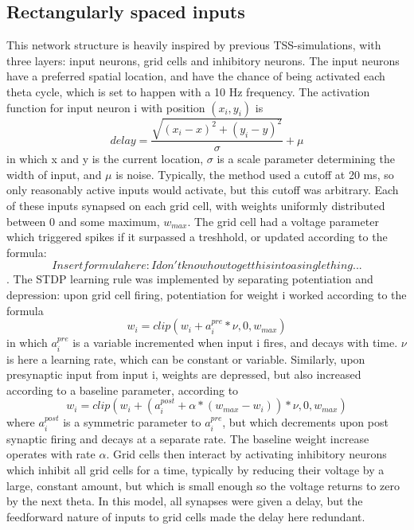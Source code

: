 \documentclass{article}
\begin{document}
    \subsection{Rectangularly spaced inputs} This network structure is heavily inspired by previous TSS-simulations, with three layers: input neurons, grid cells and inhibitory neurons. The input neurons have a preferred spatial location, and have the chance of being activated each theta cycle, which is set to happen with a 10 Hz frequency. The activation function for input neuron i with position \((x_i, y_i)\) is \[delay = \frac{\sqrt{(x_i - x)^2 + (y_i - y)^2}}{\sigma} + \mu\]
    in which x and y is the current location, \(\sigma\) is a scale parameter determining the width of input, and \(\mu\) is noise. Typically, the method used a cutoff at 20 ms, so only reasonably active inputs would activate, but this cutoff was arbitrary. Each of these inputs synapsed on each grid cell, with weights uniformly distributed between 0 and some maximum, \(w_{max}\). The grid cell had a voltage parameter which triggered spikes if it surpassed a treshhold, or updated according to the formula: \[ Insert formula here: I don't know how to get this into a single thing...\].
    The STDP learning rule was implemented by separating potentiation and depression: upon grid cell firing, potentiation for weight i worked according to the formula \[ w_i = clip(w_i + a^{pre}_i*\nu, 0, w_{max})\] in which \(a^{pre}_i\) is a variable incremented when input i fires, and decays with time. \(\nu\) is here a learning rate, which can be constant or variable. 
    Similarly, upon presynaptic input from input i, weights are depressed, but also increased according to a baseline parameter, according to \[ w_i = clip(w_i + (a^{post}_i + \alpha * (w_{max}-w_i))*\nu, 0, w_{max})\] where \(a^{post}_i\) is a symmetric parameter to \(a^{pre}_i\), but which decrements upon post synaptic firing and decays at a separate rate. The baseline weight increase operates with rate \(\alpha\).
    Grid cells then interact by activating inhibitory neurons which inhibit all grid cells for a time, typically by reducing their voltage by a large, constant amount, but which is small enough so the voltage returns to zero by the next theta.
    In this model, all synapses were given a delay, but the feedforward nature of inputs to grid cells made the delay here redundant.
\end{document}
